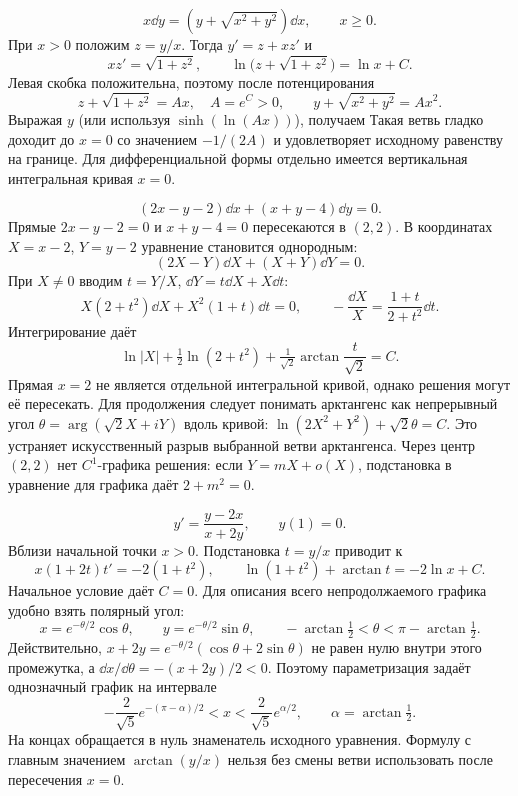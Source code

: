 \[
 x\dd y=(y+\sqrt{x^2+y^2})\dd x,\qquad x\ge0.
\]
При $x>0$ положим $z=y/x$. Тогда $y'=z+xz'$ и
\[
 xz'=\sqrt{1+z^2},\qquad
 \ln\bigl(z+\sqrt{1+z^2}\bigr)=\ln x+C.
\]
Левая скобка положительна, поэтому после потенцирования
\[
 z+\sqrt{1+z^2}=Ax,\quad A=e^C>0,
 \qquad y+\sqrt{x^2+y^2}=Ax^2.
\]
Выражая $y$ (или используя $\sinh(\ln(Ax))$), получаем
Такая ветвь гладко доходит до $x=0$ со значением $-1/(2A)$ и
удовлетворяет исходному равенству на границе. Для дифференциальной
формы отдельно имеется вертикальная интегральная кривая $x=0$.

\[
 (2x-y-2)\dd x+(x+y-4)\dd y=0.
\]
Прямые $2x-y-2=0$ и $x+y-4=0$ пересекаются в $(2,2)$.
В координатах $X=x-2$, $Y=y-2$ уравнение становится однородным:
\[
 (2X-Y)\dd X+(X+Y)\dd Y=0.
\]
При $X\ne0$ вводим $t=Y/X$, $\dd Y=t\dd X+X\dd t$:
\[
 X(2+t^2)\dd X+X^2(1+t)\dd t=0,
 \qquad -\frac{\dd X}{X}=\frac{1+t}{2+t^2}\dd t.
\]
Интегрирование даёт
\[
 \ln|X|+\tfrac12\ln(2+t^2)+\tfrac1{\sqrt2}\arctan\frac t{\sqrt2}=C.
\]
Прямая $x=2$ не является отдельной интегральной кривой, однако решения
могут её пересекать. Для продолжения следует понимать арктангенс как
непрерывный угол $\theta=\arg(\sqrt2X+iY)$ вдоль кривой:
$\ln(2X^2+Y^2)+\sqrt2\theta=C$.
Это устраняет искусственный разрыв выбранной ветви арктангенса.
Через центр $(2,2)$ нет $C^1$-графика решения: если
$Y=mX+o(X)$, подстановка в уравнение для графика даёт $2+m^2=0$.

\[
 y'=\frac{y-2x}{x+2y},\qquad y(1)=0.
\]
Вблизи начальной точки $x>0$. Подстановка $t=y/x$ приводит к
\[
 x(1+2t)t'=-2(1+t^2),\qquad
 \ln(1+t^2)+\arctan t=-2\ln x+C.
\]
Начальное условие даёт $C=0$.
Для описания всего непродолжаемого графика удобно взять полярный угол:
\[
 x=e^{-\theta/2}\cos\theta,\qquad
 y=e^{-\theta/2}\sin\theta,
 \qquad -\arctan\tfrac12<\theta<\pi-\arctan\tfrac12.
\]
Действительно, $x+2y=e^{-\theta/2}(\cos\theta+2\sin\theta)$ не равен
нулю внутри этого промежутка, а $\dd x/\dd\theta=-(x+2y)/2<0$.
Поэтому параметризация задаёт однозначный график на интервале
\[
 -\frac2{\sqrt5}e^{-(\pi-\alpha)/2}<x<
 \frac2{\sqrt5}e^{\alpha/2},\qquad \alpha=\arctan\tfrac12.
\]
На концах обращается в нуль знаменатель исходного уравнения.
Формулу с главным значением $\arctan(y/x)$ нельзя без смены ветви
использовать после пересечения $x=0$.

